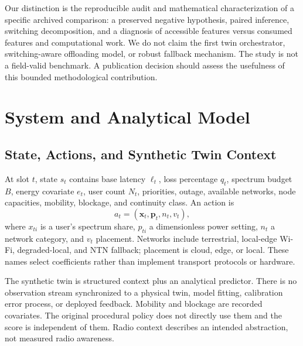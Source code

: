 \documentclass[10pt,twocolumn]{article}
\begin{document}
Our distinction is the reproducible audit and mathematical characterization of a specific archived comparison: a preserved negative hypothesis, paired inference, switching decomposition, and a diagnosis of accessible features versus consumed features and computational work. We do not claim the first twin orchestrator, switching-aware offloading model, or robust fallback mechanism. The study is not a field-valid benchmark. A publication decision should assess the usefulness of this bounded methodological contribution.

\section{System and Analytical Model}
\subsection{State, Actions, and Synthetic Twin Context}
At slot $t$, state $s_t$ contains base latency $\ell_t$, loss percentage $q_t$, spectrum budget $B$, energy covariate $e_t$, user count $N_t$, priorities, outage, available networks, node capacities, mobility, blockage, and continuity class. An action is
\begin{equation}a_t=(\boldsymbol{x}_t,\boldsymbol{p}_t,n_t,v_t),\end{equation}
where $x_{ti}$ is a user's spectrum share, $p_{ti}$ a dimensionless power setting, $n_t$ a network category, and $v_t$ placement. Networks include terrestrial, local-edge Wi-Fi, degraded-local, and NTN fallback; placement is cloud, edge, or local. These names select coefficients rather than implement transport protocols or hardware.

The synthetic twin is structured context plus an analytical predictor. There is no observation stream synchronized to a physical twin, model fitting, calibration error process, or deployed feedback. Mobility and blockage are recorded covariates. The original procedural policy does not directly use them and the score is independent of them. Radio context describes an intended abstraction, not measured radio awareness.
\end{document}
